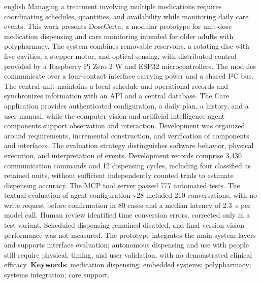 \begin{resumo}[Abstract]\begin{otherlanguage*}{english}
Managing a treatment involving multiple medications requires coordinating schedules, quantities, and availability while monitoring daily care events. This work presents DoseCerta, a modular prototype for unit-dose medication dispensing and care monitoring intended for older adults with polypharmacy. The system combines removable reservoirs, a rotating disc with five cavities, a stepper motor, and optical sensing, with distributed control provided by a Raspberry Pi Zero 2 W and ESP32 microcontrollers. The modules communicate over a four-contact interface carrying power and a shared I²C bus. The central unit maintains a local schedule and operational records and synchronizes information with an API and a central database. The Care application provides authenticated configuration, a daily plan, a history, and a user manual, while the computer vision and artificial intelligence agent components support observation and interaction. Development was organized around requirements, incremental construction, and verification of components and interfaces. The evaluation strategy distinguishes software behavior, physical execution, and interpretation of events.
Development records comprise 3,430 communication commands and 12 dispensing cycles, including four classified as retained units, without sufficient independently counted trials to estimate dispensing accuracy. The MCP tool server passed 777 automated tests. The textual evaluation of agent configuration v28 included 210 conversations, with no write request before confirmation in 80 cases and a median latency of 2.3~s per model call. Human review identified time conversion errors, corrected only in a test variant. Scheduled dispensing remained disabled, and final-version vision performance was not measured. The prototype integrates the main system layers and supports interface evaluation; autonomous dispensing and use with people still require physical, timing, and user validation, with no demonstrated clinical efficacy.
\vspace{\onelineskip}\noindent\textbf{Keywords}: medication dispensing; embedded systems; polypharmacy; systems integration; care support.
\end{otherlanguage*}\end{resumo}
